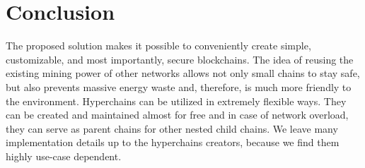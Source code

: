 \section{Conclusion}

The proposed solution makes it possible to conveniently create simple,
customizable, and most importantly, secure blockchains. The idea of reusing the
existing mining power of other networks allows not only small chains to stay
safe, but also prevents massive energy waste and, therefore, is much more
friendly to the environment. Hyperchains can be utilized in extremely flexible
ways. They can be created and maintained almost for free and in case of network
overload, they can serve as parent chains for other nested child chains. We
leave many implementation details up to the hyperchains creators, because we
find them highly use-case dependent.
